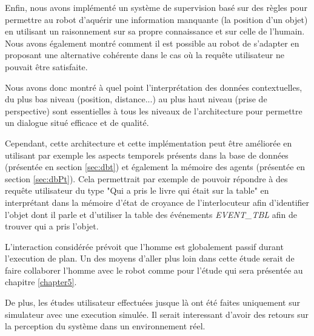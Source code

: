 \documentclass[a4paper,11pt,twoside]{StyleThese}
\begin{document}
Enfin, nous avons implémenté un système de supervision basé sur des règles pour permettre au robot d'aquérir une information manquante (la position d'un objet) en utilisant un raisonnement sur sa propre connaissance et sur celle de l'humain.
Nous avons également montré comment il est possible au robot de s'adapter en proposant une alternative cohérente dans le cas où la requête utilisateur ne pouvait être satisfaite.


Nous avons donc montré à quel point l'interprétation des données contextuelles, du plus bas niveau (position, distance...) au plus haut niveau (prise de perspective) sont essentielles à tous les niveaux de l'architecture pour permettre un dialogue situé efficace et de qualité.

Cependant, cette architecture et cette implémentation peut être améliorée en utilisant par exemple les aspects temporels présents dans la base de données (présentée en section \ref{sec:dbt}) et également la mémoire des agents (présentée en section \ref{sec:dbPt}). Cela permettrait par exemple de pouvoir répondre à des requête utilisateur du type "Qui a pris le livre qui était sur la table" en interprétant dans la mémoire d'état de croyance de l'interlocuteur afin d'identifier l'objet dont il parle et d'utiliser la table des événements  \textit{EVENT\_TBL} afin de trouver qui a pris l'objet.

L'interaction considérée prévoit que l'homme est globalement passif durant l'execution de plan. Un des moyens d'aller plus loin dans cette étude serait de faire collaborer l'homme avec le robot comme pour l'étude qui sera présentée au chapitre \ref{chapter5}.

De plus, les études utilisateur effectuées jusque là ont été faites uniquement sur simulateur avec une execution simulée. Il serait interessant d'avoir des retours sur la perception du système dans un environnement réel. 


\end{document}
